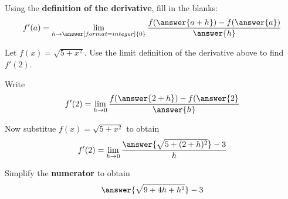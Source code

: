 \documentclass{ximera}
\begin{document}
\begin{exercise}

Using the \textbf{definition of the derivative}, fill in the blanks:
  \[
  f'(a)=
  \lim_{h\to\answer[format=integer]{0}}
  \frac{f(\answer{a+h})-f(\answer{a})}{\answer{h}}
  \]


\begin{exercise}
  Let $f(x)=\sqrt{5+x^2}$. Use the limit definition of the derivative
  above to find $f'(2)$.  
  \begin{exercise}
    Write
    \[
    f'(2) = \lim_{h\to 0}\frac{f(\answer{2+h}) -f(\answer{2}}{\answer{h}}
    \]
    \begin{exercise}
      Now substitue $f(x) = \sqrt{5+x^2}$ to obtain
      \[
      f'(2) = \lim_{h\to 0} \frac{\answer{\sqrt{5+(2+h)^2}}-3}{h}
      \]
      \begin{exercise}
        Simplify the \textbf{numerator} to obtain
        \[
        \answer{\sqrt{9 + 4h + h^2}}-3
        \]
      \end{exercise}
    \end{exercise}
  \end{exercise}
  \end{exercise}

\end{exercise}
\end{document}
